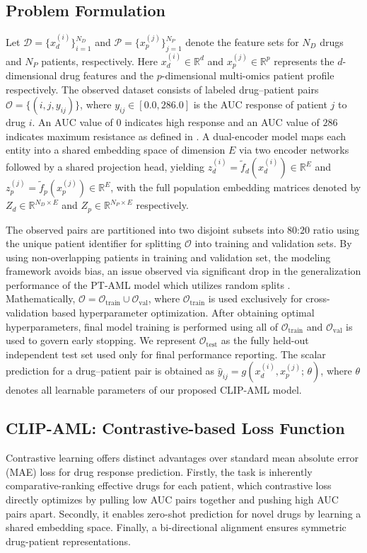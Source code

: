 \documentclass[sigconf,authordraft]{acmart}
\begin{document}
\subsection{Problem Formulation}
Let $\mathcal{D} = \{x_d^{(i)}\}_{i=1}^{N_D}$ and $\mathcal{P} = \{x_p^{(j)}\}_{j=1}^{N_P}$ denote the feature sets for $N_{D}$ drugs and $N_{P}$ patients, respectively. Here $x_d^{(i)} \in \mathbb{R}^{d}$ and $x_p^{(j)} \in \mathbb{R}^{p}$ represents the $d$-dimensional drug features and the $p$-dimensional multi-omics patient profile respectively.  The observed dataset consists of labeled drug–patient pairs $\mathcal{O} = \{(i, j, y_{ij})\}$, where $y_{ij} \in [0.0, 286.0]$ is the AUC response of patient $j$ to drug $i$. An AUC value of $0$ indicates high response and an AUC value of $286$ indicates maximum resistance as defined in \cite{tyner2018functional}. A dual-encoder model maps each entity into a shared embedding space of dimension $E$ via two encoder networks followed by a shared projection head, yielding $z_d^{(i)} = \tilde{f}_d(x_d^{(i)}) \in \mathbb{R}^E$ and $z_p^{(j)} = \tilde{f}_p(x_p^{(j)}) \in \mathbb{R}^E$, with the full population embedding matrices denoted by $Z_d \in \mathbb{R}^{N_D \times E}$
and $Z_p \in \mathbb{R}^{N_P \times E}$ respectively. 

The observed pairs are partitioned into two disjoint subsets into $80$:$20$ ratio using the unique patient identifier for splitting $\mathcal{O}$ into training and validation sets. By using non-overlapping patients in training and validation set, the modeling framework avoids bias, an issue observed via significant drop in the generalization performance of the PT-AML model which utilizes random splits \cite{jani2024pt}. 
Mathematically, $\mathcal{O} = \mathcal{O}_{\text{train}} \cup \mathcal{O}_{\text{val}}$, where $\mathcal{O}_{\text{train}}$ is used exclusively for cross-validation based hyperparameter optimization. After obtaining optimal hyperparameters, final model training is performed using all of $\mathcal{O}_{\text{train}}$ and $\mathcal{O}_{\text{val}}$ is used to govern early stopping. We represent $\mathcal{O}_{\text{test}}$ as the fully held-out independent test set used only for final performance reporting. The scalar prediction for a drug–patient pair is obtained as $\hat{y}_{ij} = g(x_d^{(i)}, x_p^{(j)};\,\theta)$, where $\theta$ denotes all learnable parameters of our proposed CLIP-AML model.
\vspace{-2mm}
\subsection{CLIP-AML: Contrastive-based Loss Function}
Contrastive learning offers distinct advantages over standard mean absolute error (MAE) loss for drug response prediction. Firstly, the task is inherently comparative-ranking effective drugs for each patient, which contrastive loss directly optimizes by pulling low AUC pairs together and pushing high AUC pairs apart. Secondly, it enables zero-shot prediction for novel drugs by learning a shared embedding space. 
Finally, a bi-directional alignment ensures symmetric drug-patient representations.%
\end{document}
